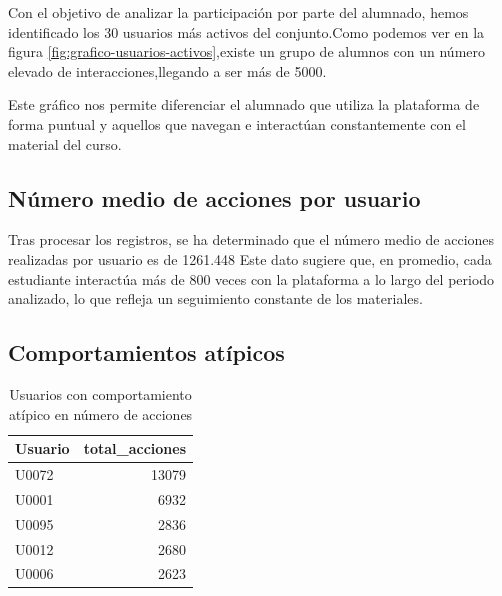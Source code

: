 \documentclass[notspecified,article,submit,moreauthors,pdftex]{Definitions/mdpi}
\newenvironment{Shaded}{\begin{snugshade}}{\end{snugshade}}
\newcommand{\AttributeTok}[1]{\textcolor[rgb]{0.13,0.29,0.53}{#1}}
\newcommand{\CommentTok}[1]{\textcolor[rgb]{0.56,0.35,0.01}{\textit{#1}}}
\newcommand{\FunctionTok}[1]{\textcolor[rgb]{0.13,0.29,0.53}{\textbf{#1}}}
\newcommand{\NormalTok}[1]{#1}
\newcommand{\OtherTok}[1]{\textcolor[rgb]{0.56,0.35,0.01}{#1}}
\newcommand{\SpecialCharTok}[1]{\textcolor[rgb]{0.81,0.36,0.00}{\textbf{#1}}}
\newcommand{\StringTok}[1]{\textcolor[rgb]{0.31,0.60,0.02}{#1}}
\begin{document}
Con el objetivo de analizar la participación por parte del alumnado,
hemos identificado los 30 usuarios más activos del conjunto.Como podemos
ver en la figura \ref{fig:grafico-usuarios-activos},existe un grupo de
alumnos con un número elevado de interacciones,llegando a ser más de
5000.

Este gráfico nos permite diferenciar el alumnado que utiliza la
plataforma de forma puntual y aquellos que navegan e interactúan
constantemente con el material del curso.

\subsection{Número medio de acciones por
usuario}\label{nuxfamero-medio-de-acciones-por-usuario}

\begin{Shaded}
\end{Shaded}

Tras procesar los registros, se ha determinado que el número medio de
acciones realizadas por usuario es de 1261.448 Este dato sugiere que, en
promedio, cada estudiante interactúa más de 800 veces con la plataforma
a lo largo del periodo analizado, lo que refleja un seguimiento
constante de los materiales.

\subsection{Comportamientos atípicos}\label{comportamientos-atuxedpicos}

\begin{longtable}[t]{lr}
\caption{\label{tab:tabla-atipicos}Usuarios con comportamiento atípico en número de acciones}\\
\toprule
Usuario & total\_acciones\\
\midrule
U0072 & 13079\\
U0001 & 6932\\
U0095 & 2836\\
U0012 & 2680\\
U0006 & 2623\\
\bottomrule
\end{longtable}
\end{document}
